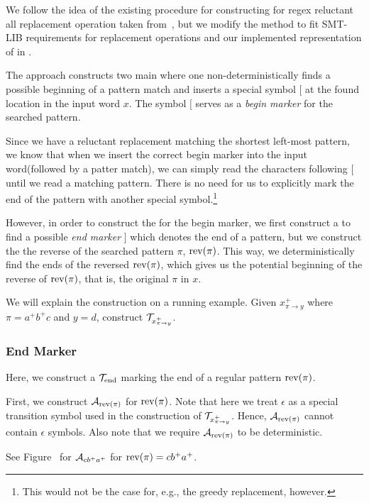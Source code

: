 We follow the idea of the existing procedure for constructing \nft for regex reluctant all replacement operation taken from~\cite{replace_nfts_model_ModelingRegularReplacementForStringConstraintSolving_DBLP:conf/nfm/FuL10}, but we modify the method to fit SMT-LIB requirements for replacement operations and our implemented representation of \nfts in \mata.

The approach constructs two main \nfts where one non-deterministically finds a possible beginning of a pattern match and inserts a special symbol $[$ at the found location in the input word $x$. The symbol $[$ serves as a \emph{begin marker} for the searched pattern.

Since we have a reluctant replacement matching the shortest left-most pattern, we know that when we insert the correct begin marker into the input word(followed by a patter match), we can simply read the characters following $[$ until we read a matching pattern. There is no need for us to explicitly mark the end of the pattern with another special symbol.\footnote{
  This would not be the case for, e.g., the greedy replacement, however.
}

However, in order to construct the \nft for the begin marker, we first construct a \dft to find a possible \emph{end marker} $]$ which denotes the end of a pattern, but we construct the \nft the reverse of the searched pattern $\pi$, $\text{rev(}\pi\text{)}$.
This way, we deterministically find the ends of the reversed $\text{rev(}\pi\text{)}$, which gives us the potential beginning of the reverse of $\text{rev(}\pi\text{)}$, that is, the original $\pi$ in $x$.

We will explain the construction on a running example.
Given $x^{+}_{\pi \rightarrow y}$ where $\pi = a^+b^+c$ and $y = d$, construct $\mathcal{T}_{x^{+}_{\pi \rightarrow y}}$.

\subsubsection{End Marker \dft}
Here, we construct a \dft $\mathcal{T}_{\text{end}}$ marking the end of a regular pattern $\text{rev(}\pi\text{)}$.

First, we construct \dfa $\mathcal{A}_{\text{rev(}\pi\text{)}}$ for $\text{rev(}\pi\text{)}$.
Note that here we treat $\epsilon$ as a special transition symbol used in the construction of $\mathcal{T}_{x^{+}_{\pi \rightarrow y}}$.
Hence, $\mathcal{A}_{\text{rev(}\pi\text{)}}$ cannot contain $\epsilon$ symbols.
Also note that we require $\mathcal{A}_{\text{rev(}\pi\text{)}}$ to be deterministic.

See Figure~\cite{fig:end_marker_dfa} for \dfa $\mathcal{A}_{cb^+a^+}$ for $\text{rev(}\pi\text{)} = cb^+a^+$.

